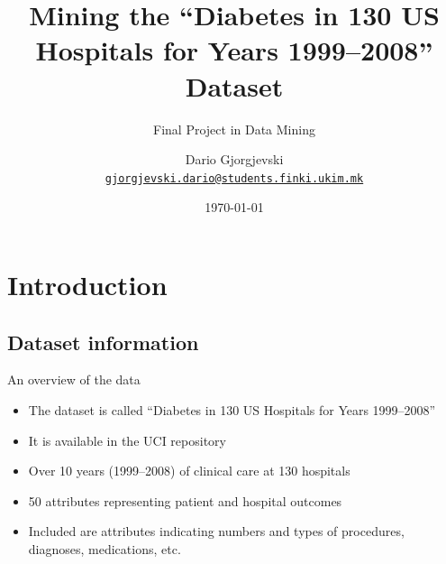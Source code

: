 \documentclass[serif, hyperref={unicode}, xcolor={x11names, psnames, dvipsnames,
  table}, usepdftitle=false]{beamer}
\begin{document}
\title[Mining for Diabetes Readmission]{Mining the ``Diabetes in 130 US
  Hospitals for Years 1999--2008'' Dataset}
\subtitle{Final Project in Data Mining}
\author[D.~Gjorgjevski]{Dario Gjorgjevski\\
  \texttt{\href{mailto:gjorgjevski.dario@students.finki.ukim.mk}
    {gjorgjevski.dario@students.finki.ukim.mk}}}
 \date{\today}


\begin{frame}
  \titlepage
\end{frame}

\section{Introduction}

\subsection{Dataset information}
\begin{frame}{An overview of the data}
  \begin{itemize}
  \item The dataset is called ``Diabetes in \num{130} US Hospitals for Years
    1999--2008''
  \item It is available in the UCI repository
  \item Over \num{10} years (1999--2008) of clinical care at \num{130} hospitals
  \item  \num{50} attributes representing patient and hospital outcomes
  \item Included are attributes indicating numbers and types of procedures,
    diagnoses, medications, etc.
  \end{itemize}
\end{frame}
\end{document}
